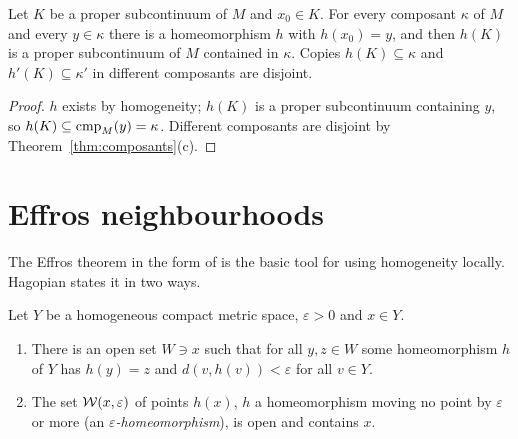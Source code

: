 
\begin{lemma}\label{lem:copies}
Let $K$ be a proper subcontinuum of $M$ and $x_0\in K$. For every composant $\kappa$ of $M$ and every
$y\in\kappa$ there is a homeomorphism $h$ with $h(x_0)=y$, and then $h(K)$ is a proper subcontinuum of $M$
contained in $\kappa$. Copies $h(K)\subseteq\kappa$ and $h'(K)\subseteq\kappa'$ in different composants are disjoint.
\end{lemma}

\begin{proof}
$h$ exists by homogeneity; $h(K)$ is a proper subcontinuum containing $y$, so $h(K)\subseteq\operatorname{cmp}_{M}(y)=\kappa$.
Different composants are disjoint by Theorem~\ref{thm:composants}(c).
\end{proof}


\section{Effros neighbourhoods}

The Effros theorem in the form of  is the basic tool for using homogeneity
locally. Hagopian states it in two ways.

\begin{proposition}\label{prop:effros-nbhd}
Let $Y$ be a homogeneous compact metric space, $\varepsilon>0$ and $x\in Y$.
\begin{enumerate}[label=(\alph*)]
\item There is an open set $W\ni x$ such that for all $y,z\in W$ some homeomorphism $h$ of $Y$ has
$h(y)=z$ and $d(v,h(v))<\varepsilon$ for all $v\in Y$.
\item The set $\mathcal{W}(x,\varepsilon)$ of points $h(x)$, $h$ a homeomorphism moving no point by $\varepsilon$ or
more (an \emph{$\varepsilon$-homeomorphism}), is open and contains $x$.
\end{enumerate}
\end{proposition}

